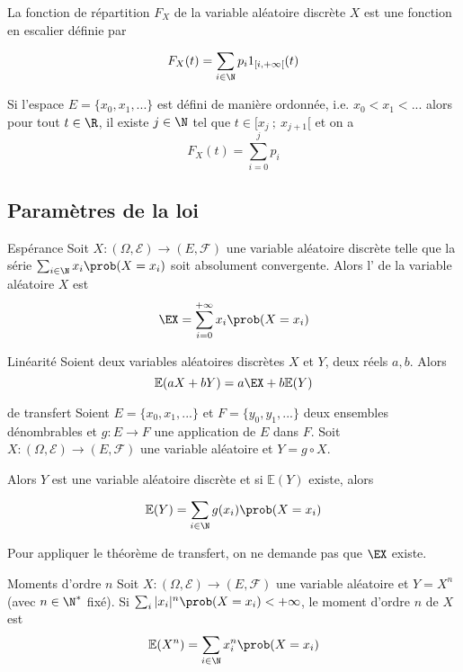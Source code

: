 La fonction de répartition $F_X$ de la variable aléatoire discrète $X$ est une fonction en escalier définie par 

$$F_X(t) = \sum_{i \in \N } p_i 1_{[i, +\infty[}(t)$$

Si l'espace $E=\{x_0,x_1,...\}$ est défini de manière ordonnée, i.e. $x_0<x_1<...$ alors pour tout $t \in \R $, il existe $j \in \N $ tel que $t \in [x_j~;~x_{j+1}[$ et on a 
$$F_X(t)=\sum_{i=0}^j p_i$$

\subsection{Paramètres de la loi}

\begin{definition}{Espérance}{}
	Soit $X \colon (\Omega,\mathcal{E}) \to (E,\mathcal{F})$ une variable aléatoire discrète telle que la série $\sum_{i \in \N } x_i \prob(X=x_i)$ soit absolument convergente. Alors l' de la variable aléatoire $X$ est 
	$$\EX = \sum_{i=0}^{+\infty} x_i \prob(X=x_i)$$
\end{definition}


\begin{proposition}{Linéarité}{}
	Soient deux variables aléatoires discrètes $X$ et $Y$, deux réels $a,b$. Alors 
	$$\mathbb{E}(aX+bY)=a\EX + b \mathbb{E}(Y)$$
\end{proposition}

\begin{theoreme}{de transfert}{}
	Soient $E=\{x_0,x_1,...\}$ et $F=\{y_0,y_1,...\}$ deux ensembles dénombrables et $g \colon E \rightarrow F$ une application de $E$ dans $F$. 
	Soit $X \colon (\Omega,\mathcal{E}) \to (E,\mathcal{F})$ une variable aléatoire et $Y=g \circ X$.
	
	Alors $Y$ est une variable aléatoire discrète et si $\mathbb{E}(Y)$ existe, alors
	
	$$\mathbb{E}(Y)=\sum_{i \in \N} g(x_i)\prob(X=x_i)$$
\end{theoreme}

Pour appliquer le théorème de transfert, on ne demande pas que $\EX$ existe. 


\begin{definition}{Moments d'ordre $n$}{}
		Soit $X \colon (\Omega,\mathcal{E}) \to (E,\mathcal{F})$ une variable aléatoire et $Y=X^n$ (avec $n \in \N^*$ fixé). Si $\sum_i |x_i|^n \prob(X=x_i) < +\infty$, le moment d'ordre $n$ de $X$ est 
		$$\mathbb{E}(X^n)=\sum_{i \in \N} x_i^n \prob(X=x_i)$$
\end{definition}

